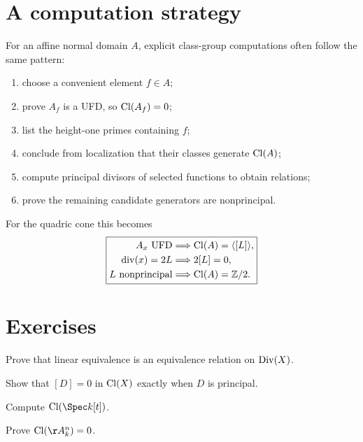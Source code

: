 \section{A computation strategy}

For an affine normal domain \(A\), explicit class-group computations often follow the same pattern:
\begin{enumerate}
\item choose a convenient element \(f\in A\);
\item prove \(A_f\) is a UFD, so \(\operatorname{Cl}(A_f)=0\);
\item list the height-one primes containing \(f\);
\item conclude from localization that their classes generate \(\operatorname{Cl}(A)\);
\item compute principal divisors of selected functions to obtain relations;
\item prove the remaining candidate generators are nonprincipal.
\end{enumerate}

For the quadric cone this becomes
\[
\boxed{\begin{aligned}
A_x\text{ UFD}
&\Longrightarrow \operatorname{Cl}(A)=\langle[L]\rangle,\\
\operatorname{div}(x)=2L
&\Longrightarrow 2[L]=0,\\
L\text{ nonprincipal}
&\Longrightarrow \operatorname{Cl}(A)=\mathbb Z/2.
\end{aligned}}
\]



\section{Exercises}

\begin{exercise}\label{exr:vi41-01}
Prove that linear equivalence is an equivalence relation on \(\operatorname{Div}(X)\).
\end{exercise}

\begin{exercise}\label{exr:vi41-02}
Show that \([D]=0\) in \(\operatorname{Cl}(X)\) exactly when \(D\) is principal.
\end{exercise}

\begin{exercise}\label{exr:vi41-03}
Compute \(\Cl(\Spec k[t])\).
\end{exercise}

\begin{exercise}\label{exr:vi41-04}
Prove \(\Cl(\AA^n_k)=0\).
\end{exercise}

